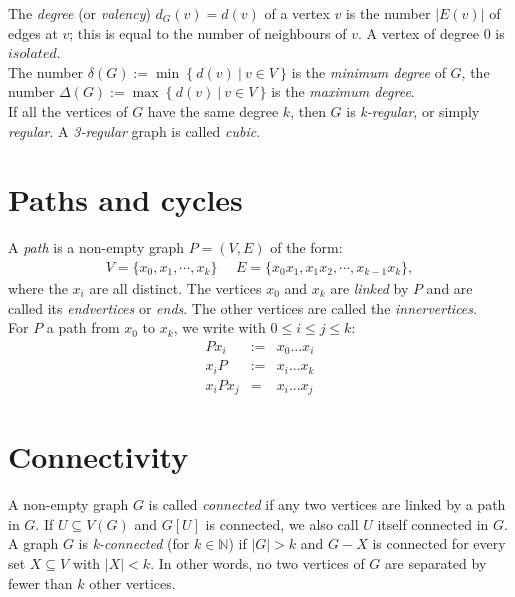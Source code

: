 		The \textit{degree} (or \textit{valency}) $d_G (v) = d(v)$ of a vertex $v$ is the number $|E(v)|$ of edges at $v$; this is equal to the number of neighbours of $v$. A vertex of degree 0 is $isolated$. \\
		
		The number $\delta(G) := \min~ \{~ d(v) ~| ~v \in V ~\}$ is the \textit{minimum degree} of $G$, the number $\Delta(G) := \max ~\{~ d(v) ~|~ v \in V ~\}$ is the \textit{maximum degree}.\\
		
		If all the vertices of $G$ have the same degree $k$, then $G$ is \textit{k-regular}, or simply \textit{regular}. A \textit{3-regular} graph is called \textit{cubic}.
	
	\section{Paths and cycles}
		A \textit{path} is a non-empty graph $P = (V, E)$ of the form:
		\begin{eqnarray*}
			V = \{x_0, x_1, \dotsb, x_k \} ~~~~~~ E = \{x_0x_1, x_1x_2, \dotsb, x_{k-1}x_k\},
		\end{eqnarray*}		
		where the $x_i$ are all distinct. The vertices $x_0$ and $x_k$ are \textit{linked} by $P$ and are called its \textit{endvertices} or \textit{ends}. The other vertices are called the \textit{innervertices}.\\
		
		For $P$ a path from $x_0$ to $x_k$, we write with $0 \leq i \leq j \leq k$:
		\begin{eqnarray*}
			Px_i &:=& x_0 ... x_i\\
			x_iP &:=& x_i ... x_k\\
			x_iPx_j &=& x_i ... x_j
		\end{eqnarray*}
	
	\section{Connectivity}
		A non-empty graph $G$ is called \textit{connected} if any two vertices are linked by a path in $G$. If $U \subseteq V(G)$ and $G[U]$ is connected, we also call $U$ itself connected in $G$.\\
		
		A graph $G$ is \textit{k-connected} (for $k \in \mathbb{N}$) if $|G| > k$ and $G - X$ is connected for every set $X \subseteq V$ with $|X| < k$. In other words, no two vertices of $G$ are separated by fewer than $k$ other vertices.
		
